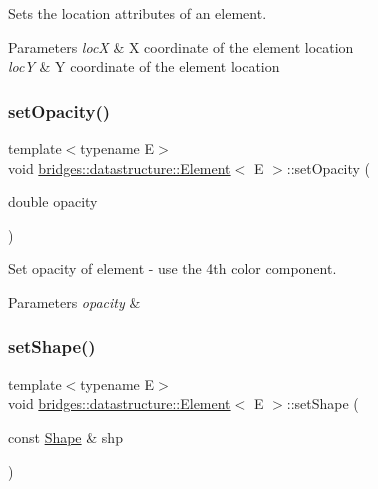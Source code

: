 Sets the location attributes of an element. 


\begin{DoxyParams}{Parameters}
{\em locX} & X coordinate of the element location \\
\hline
{\em locY} & Y coordinate of the element location \\
\hline
\end{DoxyParams}
\mbox{\label{classbridges_1_1datastructure_1_1_element_acb5d0b5734a6b3c17b7b1784ae1dc79c}} 
\subsubsection{\texorpdfstring{set\+Opacity()}{setOpacity()}}
{\footnotesize\ttfamily template$<$typename E$>$ \\
void \hyperlink{classbridges_1_1datastructure_1_1_element}{bridges\+::datastructure\+::\+Element}$<$ E $>$\+::set\+Opacity (\begin{DoxyParamCaption}\item[{double}]{opacity }\end{DoxyParamCaption})\hspace{0.3cm}{\ttfamily [inline]}}



Set opacity of element -\/ use the 4th color component. 


\begin{DoxyParams}{Parameters}
{\em opacity} & \\
\hline
\end{DoxyParams}
\mbox{\label{classbridges_1_1datastructure_1_1_element_a1ef398bf1027244a624575e58a569ed9}} 
\subsubsection{\texorpdfstring{set\+Shape()}{setShape()}}
{\footnotesize\ttfamily template$<$typename E$>$ \\
void \hyperlink{classbridges_1_1datastructure_1_1_element}{bridges\+::datastructure\+::\+Element}$<$ E $>$\+::set\+Shape (\begin{DoxyParamCaption}\item[{const \hyperlink{namespacebridges_1_1datastructure_a3408f5f44d9c6062e5f3adb7e1bbb7f0}{Shape} \&}]{shp }\end{DoxyParamCaption})\hspace{0.3cm}{\ttfamily [inline]}}



